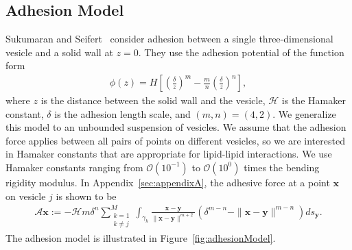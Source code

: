 \documentclass[prf,superscriptaddress,showpacs]{revtex4-1}
\renewcommand{\AA}{\mathcal{A}}
\newcommand{\xx}{\mathbf{x}}
\newcommand{\yy}{\mathbf{y}}
\begin{document}
\subsection{Adhesion Model}
Sukumaran and Seifert~\cite{suk-sei2001} consider adhesion between a
single three-dimensional vesicle and a solid wall at $z=0$.  They use
the adhesion potential of the function form
\begin{align}
\label{eq:adhesion_potential}
  \phi(z) = H \left[ 
    \left(\frac{\delta}{z}\right)^m - \frac{m}{n} \left(\frac{\delta}{z}\right)^n \right],
\end{align}
where $z$ is the distance between the solid wall and the vesicle,
$\mathcal{H}$ is the Hamaker constant, $\delta$ is the adhesion length
scale, and $(m,n) = (4,2)$.  We generalize this model to an unbounded
suspension of vesicles. We assume that the adhesion force applies
between all pairs of points on different vesicles, so we are interested
in Hamaker constants that are appropriate for lipid-lipid interactions.
We use Hamaker constants ranging from $\mathcal{O}(10^{-1})$ to
$\mathcal{O}(10^0)$ times the bending rigidity modulus.  In
Appendix~\ref{sec:appendixA}, the adhesive force at a point $\xx$ on
vesicle $j$ is shown to be
\begin{align}
  \AA\xx:=-\mathcal{H} m \delta^{n}\sum_{\substack{k=1 \\ k \neq j}}^M 
  \int_{\gamma_k} \frac{\xx - \yy}{\|\xx - \yy\|^{m+2}} 
  \left(\delta^{m-n} - \|\xx - \yy\|^{m-n} \right) ds_\yy.
  \label{eqn:adhesionForce}
\end{align}
The adhesion model is illustrated in Figure~\ref{fig:adhesionModel}.
\end{document}
